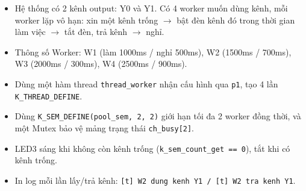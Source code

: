 \begin{tcolorbox}[
    enhanced, colback=black!2, colframe=black!60, boxrule=1pt, arc=2.5mm, drop shadow,
    attach boxed title to top left={xshift=4mm, yshift=-3mm},
    boxed title style={enhanced, colback=black!85, colframe=black!85, boxrule=1pt, arc=2.5mm, drop shadow, left=6pt, right=6pt, top=2pt, bottom=2pt},
    title=\textcolor{white}{\large\textbf{Yêu cầu đề bài (Trích phiếu bài tập)}}
]
\bfseries
\vspace{0.2cm}
\begin{itemize}
    \item Hệ thống có 2 kênh output: Y0 và Y1. Có 4 worker muốn dùng kênh, mỗi worker lặp vô hạn: xin một kênh trống $\rightarrow$ bật đèn kênh đó trong thời gian làm việc $\rightarrow$ tắt đèn, trả kênh $\rightarrow$ nghỉ.
    \item Thông số Worker: W1 (làm 1000ms / nghỉ 500ms), W2 (1500ms / 700ms), W3 (2000ms / 300ms), W4 (2500ms / 900ms).
    \item Dùng một hàm thread \texttt{thread\_worker} nhận cấu hình qua \texttt{p1}, tạo 4 lần \texttt{K\_THREAD\_DEFINE}.
    \item Dùng \texttt{K\_SEM\_DEFINE(pool\_sem, 2, 2)} giới hạn tối đa 2 worker đồng thời, và một Mutex bảo vệ mảng trạng thái \texttt{ch\_busy[2]}.
    \item LED3 sáng khi không còn kênh trống (\texttt{k\_sem\_count\_get == 0}), tắt khi có kênh trống.
    \item In log mỗi lần lấy/trả kênh: \texttt{[t] W2 dung kenh Y1 / [t] W2 tra kenh Y1}.
\end{itemize}
\end{tcolorbox}

\vspace{0.3cm}
